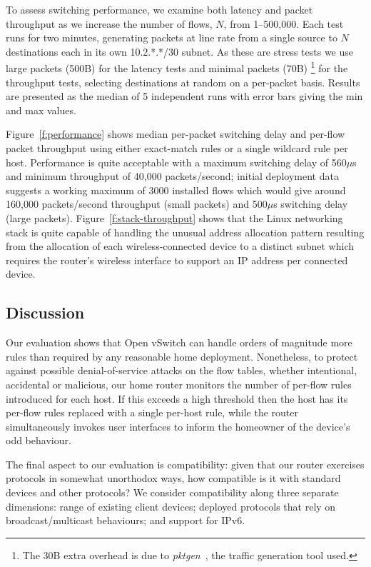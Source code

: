 To assess switching performance, we examine both latency and packet throughput
as we increase the number of flows, $N$, from 1--500,000.  Each test runs for
two minutes, generating packets at line rate from a single source to $N$
destinations each in its own 10.2.*.*/30 subnet.  As these are stress tests we
use large packets (500B) for the latency tests and minimal packets (70B)
\footnote{The 30B extra overhead is due to
  \emph{pktgen}~\cite{olsson05:_linux_packet_gener}, the traffic generation tool
  used.} for the throughput tests, selecting destinations at random on a
per-packet basis.  Results are presented as the median of 5 independent runs
with error bars giving the min and max values. 

Figure~\ref{f:performance} shows median per-packet switching delay and per-flow
packet throughput using either exact-match rules or a single wildcard rule per
host.  Performance is quite acceptable with a maximum switching delay of
560$\mu$s and minimum throughput of 40,000 packets/second; initial deployment
data suggests a working maximum of 3000 installed flows which would give around
160,000 packets/second throughput (small packets) and 500$\mu$s switching delay
(large packets).  Figure~\ref{f:stack-throughput} shows that the Linux
networking stack is quite capable of handling the unusual address allocation
pattern resulting from the allocation of each wireless-connected device to a
distinct subnet which requires the router's wireless interface to support an IP
address per connected device. 

\subsection{Discussion}

Our evaluation shows that Open vSwitch can handle orders of magnitude more rules
than required by any reasonable home deployment.  Nonetheless, to protect
against possible denial-of-service attacks on the flow tables, whether
intentional, accidental or malicious, our home router monitors the number of
per-flow rules introduced for each host.  If this exceeds a high threshold then
the host has its per-flow rules replaced with a single per-host rule, while the
router simultaneously invokes user interfaces to inform the homeowner of the
device's odd behaviour. 

The final aspect to our evaluation is compatibility: given that our router
exercises protocols in somewhat unorthodox ways, how compatible is it with
standard devices and other protocols?  We consider compatibility along three
separate dimensions: range of existing client devices; deployed protocols that
rely on broadcast/multicast behaviours; and support for IPv6. 

